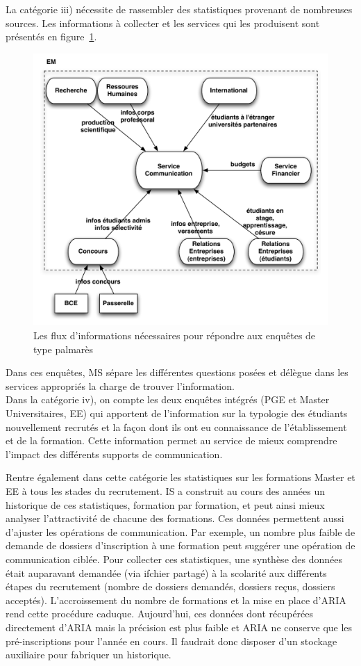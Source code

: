 \documentclass{book}
\begin{document}
La catégorie iii) nécessite de rassembler des statistiques provenant de 
nombreuses sources. Les informations à collecter et les services qui les 
produisent sont présentés en figure~\ref{fg:comm_flux}.
\begin{figure}[hbt]
\begin{center}
\includegraphics[width=.75\linewidth]{figs/comm_flux.pdf}
\end{center}
\caption{Les flux d'informations nécessaires pour répondre aux enquêtes de type palmarès}
\label{fg:comm_flux}
\end{figure}
Dans ces enquêtes, MS sépare les différentes questions posées et délègue
dans les services appropriés la charge de trouver l'information.\\


Dans la catégorie iv), on compte les deux enquêtes intégrés (PGE et Master 
Universitaires, EE) qui apportent de l'information sur la typologie des 
étudiants nouvellement recrutés et la façon dont ils ont eu connaissance
de l'établissement et de la formation. Cette information permet au service
de mieux comprendre l'impact des différents supports de communication.

Rentre également dans cette catégorie les statistiques sur les formations
Master et EE à tous les stades du recrutement. IS a construit au cours 
des années un historique de ces statistiques, formation par formation,
et peut ainsi mieux analyser l'attractivité de chacune des formations.
Ces données permettent aussi d'ajuster les opérations de communication.
Par exemple, un nombre plus faible de demande de dossiers d'inscription 
à une formation peut suggérer une opération de communication ciblée.
Pour collecter ces statistiques, une synthèse des données était auparavant
demandée (via ifchier partagé) à la scolarité aux différents étapes du 
recrutement (nombre de dossiers demandés, dossiers reçus, dossiers acceptés). 
L'accroissement du nombre de formations et la mise en place d'ARIA rend 
cette procédure caduque. Aujourd'hui, ces données dont récupérées
directement d'ARIA mais la précision est plus faible et ARIA ne 
conserve que les pré-inscriptions pour l'année en cours. Il faudrait
donc disposer d'un stockage auxiliaire pour fabriquer un historique.
\end{document}
